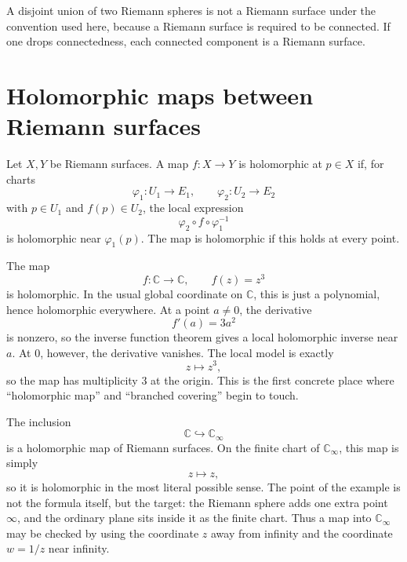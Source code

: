 \begin{example}
A disjoint union of two Riemann spheres is not a Riemann surface under the convention used here, because a Riemann surface is required to be connected.  If one drops connectedness, each connected component is a Riemann surface.
\end{example}

\section{Holomorphic maps between Riemann surfaces}

\begin{definition}
Let \(X,Y\) be Riemann surfaces.  A map \(f:X\to Y\) is holomorphic at \(p\in X\) if, for charts
\[
  \varphi_1:U_1\to E_1,\qquad \varphi_2:U_2\to E_2
\]
with \(p\in U_1\) and \(f(p)\in U_2\), the local expression
\[
  \varphi_2\circ f\circ\varphi_1^{-1}
\]
is holomorphic near \(\varphi_1(p)\).  The map is holomorphic if this holds at every point.
\end{definition}

\begin{example}
The map
\[
  f:\mathbb C\to\mathbb C,\qquad f(z)=z^3
\]
is holomorphic.  In the usual global coordinate on \(\mathbb C\), this is just a polynomial, hence holomorphic everywhere.  At a point \(a\neq0\), the derivative
\[
  f'(a)=3a^2
\]
is nonzero, so the inverse function theorem gives a local holomorphic inverse near \(a\).  At \(0\), however, the derivative vanishes.  The local model is exactly
\[
  z\mapsto z^3,
\]
so the map has multiplicity \(3\) at the origin.  This is the first concrete place where ``holomorphic map'' and ``branched covering'' begin to touch.
\end{example}

\begin{example}
The inclusion
\[
  \mathbb C\hookrightarrow \mathbb C_\infty
\]
is a holomorphic map of Riemann surfaces.  On the finite chart of \(\mathbb C_\infty\), this map is simply
\[
  z\mapsto z,
\]
so it is holomorphic in the most literal possible sense.  The point of the example is not the formula itself, but the target: the Riemann sphere adds one extra point \(\infty\), and the ordinary plane sits inside it as the finite chart.  Thus a map into \(\mathbb C_\infty\) may be checked by using the coordinate \(z\) away from infinity and the coordinate \(w=1/z\) near infinity.
\end{example}

